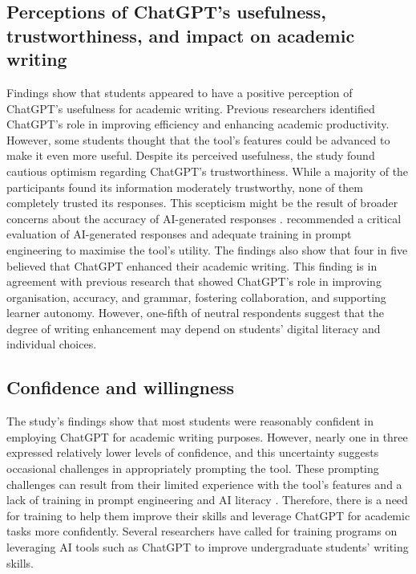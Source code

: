 \documentclass[english]{textolivre}
\begin{document}
\subsection{Perceptions of ChatGPT’s usefulness, trustworthiness, and impact on academic writing}
Findings show that students appeared to have a positive perception of ChatGPT’s usefulness for academic writing. Previous researchers \cite{abusaaleek2024, alkamel2024, bekturova2025, duong2025, klimova2024} identified ChatGPT’s role in improving efficiency and enhancing academic productivity. However, some students thought that the tool’s features could be advanced to make it even more useful. Despite its perceived usefulness, the study found cautious optimism regarding ChatGPT’s trustworthiness. While a majority of the participants found its information moderately trustworthy, none of them completely trusted its responses. This scepticism might be the result of broader concerns about the accuracy of AI-generated responses \cite{bekturova2025, higgs2024, teng2024a}. \textcite{meniado2024} recommended a critical evaluation of AI-generated responses and adequate training in prompt engineering to maximise the tool’s utility. The findings also show that four in five believed that ChatGPT enhanced their academic writing. This finding is in agreement with previous research \cite{crcek2023, mahapatra2024} that showed ChatGPT’s role in improving organisation, accuracy, and grammar, fostering collaboration, and supporting learner autonomy. However, one-fifth of neutral respondents suggest that the degree of writing enhancement may depend on students’ digital literacy and individual choices.

\subsection{Confidence and willingness}
The study’s findings show that most students were reasonably confident in employing ChatGPT for academic writing purposes. However, nearly one in three expressed relatively lower levels of confidence, and this uncertainty suggests occasional challenges in appropriately prompting the tool. These prompting challenges can result from their limited experience with the tool’s features and a lack of training in prompt engineering and AI literacy \cite{mahapatra2024}. Therefore, there is a need for training to help them improve their skills and leverage ChatGPT for academic tasks more confidently. Several researchers \cite{meniado2024, punar2024, teng2024a} have called for training programs on leveraging AI tools such as ChatGPT to improve undergraduate students’ writing skills.
\end{document}
